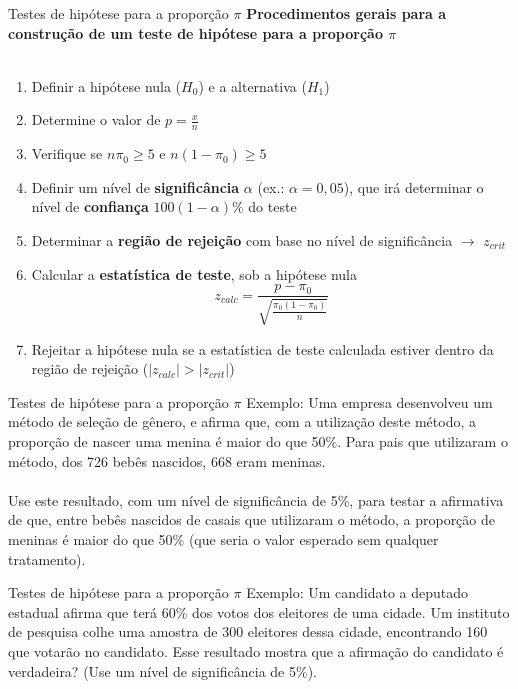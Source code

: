 \documentclass[10pt]{beamer}\usepackage[]{graphicx}\usepackage[]{color}
\theoremstyle{definition}
\begin{document}
\begin{frame}{Testes de hipótese para a proporção $\pi$}
  \textbf{Procedimentos gerais para a construção de um teste de hipótese
    para a proporção $\pi$} \\~\\
  \begin{enumerate}
  \item Definir a hipótese nula ($H_0$) e a alternativa ($H_1$)
  \item Determine o valor de $p = \frac{x}{n}$
  \item Verifique se $n\pi_0 \geq 5$ e $n(1-\pi_0) \geq 5$
  \item Definir um nível de \textbf{significância} $\alpha$ (ex.: $\alpha
    = 0,05$), que irá determinar o nível de \textbf{confiança}
    $100(1-\alpha)\%$ do teste
  \item Determinar a \textbf{região de rejeição} com base no nível de
    significância $\rightarrow$ $z_{crit}$
  \item Calcular a \textbf{estatística de teste}, sob a hipótese nula
    \begin{equation*}
      z_{calc} = \frac{p - \pi_0}{\sqrt{\frac{\pi_0(1-\pi_0)}{n}}}
    \end{equation*}
  \item Rejeitar a hipótese nula se a estatística de teste calculada
    estiver dentro da região de rejeição ($|z_{calc}| > |z_{crit}|$)
  \end{enumerate}
\end{frame}

\begin{frame}{Testes de hipótese para a proporção $\pi$}
  Exemplo: Uma empresa desenvolveu um método de seleção de gênero, e
  afirma que, com a utilização deste método, a proporção de nascer uma
  menina é maior do que 50\%. Para pais que utilizaram o método, dos 726
  bebês nascidos, 668 eram meninas.\\~\\
  Use este resultado, com um nível de significância de 5\%, para testar
  a afirmativa de que, entre bebês nascidos de casais que utilizaram o
  método, a proporção de meninas é maior do que 50\% (que seria o valor
  esperado sem qualquer tratamento).
\end{frame}

\begin{frame}{Testes de hipótese para a proporção $\pi$}
  Exemplo: Um candidato a deputado estadual afirma que terá 60\% dos
  votos dos eleitores de uma cidade. Um instituto de pesquisa colhe uma
  amostra de 300 eleitores dessa cidade, encontrando 160 que votarão no
  candidato. Esse resultado mostra que a afirmação do candidato é
  verdadeira? (Use um nível de significância de 5\%).
\end{frame}
\end{document}
